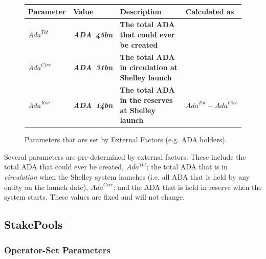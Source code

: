 \documentclass[11pt,a4paper,dvipsnames,twosided,final]{article}
\newcommand{\ada}{ADA{}}
\newcommand{\ADA}[1]{\textbf{\emph{\ada~{#1}}}}
\begin{document}
\begin{figure}[h!]
\begin{center}
\begin{tabular}{||l|l|p{6cm}|l||}
  \hline \hline
\textbf{Parameter} & \textbf{Value} & \textbf{Description} & \textbf{Calculated as} \\\hline
\textbf{\color{blue} $\textit{Ada}^{Tot}$ } & \textbf{\color{blue}  \ADA{45bn} } & \textbf{\color{blue}  The total \ada{} that could ever be created } & \textbf{\color{blue}  } \\\hline
\textbf{\color{blue} $\textit{Ada}^{\textit{Circ}}$ } & \textbf{\color{blue}  \ADA{31bn} } & \textbf{\color{blue}  The total \ada{} in circulation at Shelley launch } & \textbf{\color{blue}  } \\\hline
\textbf{\color{blue} $\textit{Ada}^{\textit{Rsv}}$ } & \textbf{\color{blue}  \ADA{14bn} } & \textbf{\color{blue}  The total \ada{} in the reserves at Shelley launch } & \textbf{\color{blue}  $\textit{Ada}^{Tot} - \textit{Ada}^{\textit{Circ}}$ } \\\hline
\hline
\end{tabular}
\end{center}
\caption{Parameters that are set by External Factors (e.g. \ada{} holders).}
\end{figure}

\noindent
Several parameters are pre-determined by external factors. These include the
total \ada{} that could ever be created, $\textit{Ada}^{Tot}$;
the total \ada{} that is in \emph{circulation} when the Shelley system launches
(i.e. all \ada{} that is held by any entity on the launch date), $\textit{Ada}^{\textit{Circ}}$;
and the \ada{} that is held in reserve when the system starts.
These values are fixed and will not change.

\subsection{StakePools}

\subsubsection*{Operator-Set Parameters}
\end{document}
